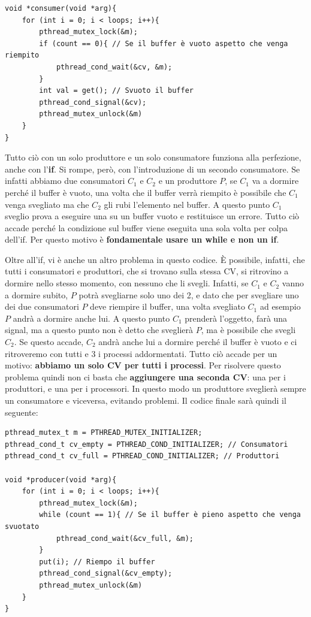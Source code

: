 \documentclass[11pt, a4paper, titlepage, oneside]{scrbook}
\begin{document}
\begin{lstlisting}[style=C]
void *consumer(void *arg){
    for (int i = 0; i < loops; i++){
        pthread_mutex_lock(&m);
        if (count == 0){ // Se il buffer è vuoto aspetto che venga riempito
            pthread_cond_wait(&cv, &m);
        }
        int val = get(); // Svuoto il buffer
        pthread_cond_signal(&cv);
        pthread_mutex_unlock(&m)
    }
}
\end{lstlisting}

Tutto ciò con un solo produttore e un solo consumatore funziona alla perfezione, anche con l'\textbf{if}. Si rompe, però, con l'introduzione di un secondo consumatore. Se infatti abbiamo due consumatori $C_1$ e $C_2$ e un produttore $P$, se $C_1$ va a dormire perché il buffer è vuoto, una volta che il buffer verrà riempito è possibile che $C_1$ venga svegliato ma che $C_2$ gli rubi l'elemento nel buffer. A questo punto $C_1$ sveglio prova a eseguire una  su un buffer vuoto e restituisce un errore. Tutto ciò accade perché la condizione sul buffer viene eseguita una sola volta per colpa dell'if. Per questo motivo è \textbf{fondamentale usare un while e non un if}.

Oltre all'if, vi è anche un altro problema in questo codice. È possibile, infatti, che tutti i consumatori e produttori, che si trovano sulla stessa CV, si ritrovino a dormire nello stesso momento, con nessuno che li svegli. Infatti, se $C_1$ e $C_2$ vanno a dormire subito, $P$ potrà svegliarne solo uno dei 2, e dato che per svegliare uno dei due consumatori $P$ deve riempire il buffer, una volta svegliato $C_1$ ad esempio $P$ andrà a dormire anche lui. A questo punto $C_1$ prenderà l'oggetto, farà una signal, ma a questo punto non è detto che sveglierà $P$, ma è possibile che svegli $C_2$. Se questo accade, $C_2$ andrà anche lui a dormire perché il buffer è vuoto e ci ritroveremo con tutti e 3 i processi addormentati. Tutto ciò accade per un motivo: \textbf{abbiamo un solo CV per tutti i processi}. Per risolvere questo problema quindi non ci basta che \textbf{aggiungere una seconda CV}: una per i produttori, e una per i processori. In questo modo un produttore sveglierà sempre un consumatore e viceversa, evitando problemi. Il codice finale sarà quindi il seguente:


\begin{lstlisting}[style=C]
pthread_mutex_t m = PTHREAD_MUTEX_INITIALIZER;
pthread_cond_t cv_empty = PTHREAD_COND_INITIALIZER; // Consumatori
pthread_cond_t cv_full = PTHREAD_COND_INITIALIZER; // Produttori

void *producer(void *arg){
    for (int i = 0; i < loops; i++){
        pthread_mutex_lock(&m);
        while (count == 1){ // Se il buffer è pieno aspetto che venga svuotato
            pthread_cond_wait(&cv_full, &m);
        }
        put(i); // Riempo il buffer
        pthread_cond_signal(&cv_empty);
        pthread_mutex_unlock(&m)
    }
}
\end{lstlisting}
\end{document}
